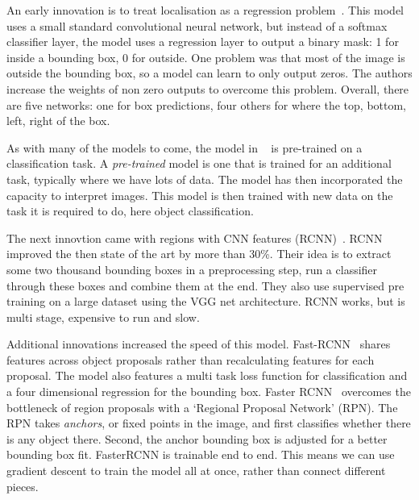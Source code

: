 \documentclass[12pt, a4paper, oneside, headinclude, footinclude]{article}
\begin{document}
An early innovation is to treat localisation as a regression
problem~\cite{NIPS2013_5207}. This model uses a small standard convolutional
neural network, but instead of a softmax classifier layer, the model uses a
regression layer to output a binary mask: 1 for inside a bounding box, 0 for
outside. One problem was that most of the image is outside the bounding box,
so a model can learn to only output zeros. The authors increase the weights of
non zero outputs to overcome this problem. Overall, there are five networks:
one for box predictions, four others for where the {top, bottom, left, right}
of the box. 

As with many of the models to come, the model in ~\cite{NIPS2013_5207} is
pre-trained on a classification task. A \textit{pre-trained} model is one that
is trained for an additional task, typically where we have lots of data. The
model has then incorporated the capacity to interpret images. This model is
then trained with new data on the task it is required to do, here object
classification. 

The next innovtion came with regions with CNN features
(RCNN)~\cite{Girshick2014, Girshick2015}. RCNN improved the then state of the
art by more than 30\%. Their idea is to extract some two thousand bounding
boxes in a preprocessing step, run a classifier through these boxes and
combine them at the end. They also use supervised pre training on a large
dataset using the VGG net architecture. RCNN works, but is multi stage,
expensive to run and slow. 

Additional innovations increased the speed of this model.
Fast-RCNN~\cite{Girshick2015} shares features across object proposals rather
than recalculating features for each proposal. The model also features a multi
task loss function for classification and a four dimensional regression for
the bounding box. Faster RCNN~\cite{Ren2017} overcomes the bottleneck of
region proposals with a `Regional Proposal Network' (RPN). The RPN takes
\textit{anchors}, or fixed points in the image, and first classifies whether
there is any object there.  Second, the anchor bounding box is adjusted for a
better bounding box fit. FasterRCNN is trainable end to end. This means we can
use gradient descent to train the model all at once, rather than connect
different pieces. 

\end{document}
